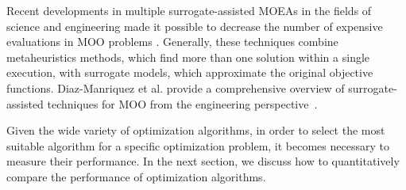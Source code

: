	
	Recent developments in multiple surrogate-assisted \acp{MOEA} in the fields of science and engineering made it possible to decrease the number of expensive evaluations in \ac{MOO} problems \cite{Hussein2016,Zapotecas-Martinez2016}. Generally, these techniques combine metaheuristics methods, which find more than one solution within a single execution, with surrogate models, which approximate the original objective functions. Diaz-Manriquez et al. provide a comprehensive overview of surrogate-assisted techniques for \ac{MOO} from the engineering perspective~\cite{Diaz-Manriquez2016}. 
	
	Given the wide variety of optimization algorithms, in order to select the most suitable algorithm for a specific optimization problem, it becomes necessary to measure their performance. In the next section, we discuss how to quantitatively compare the performance of optimization algorithms.
	
	
